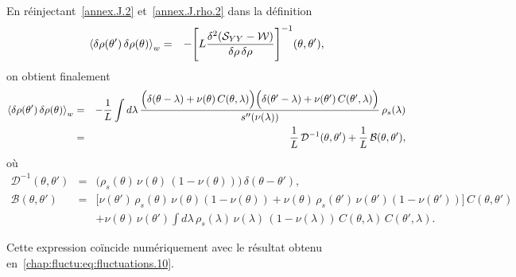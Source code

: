 En réinjectant~\eqref{annex.J.2} et~\eqref{annex.J.rho.2} dans la définition
\begin{eqnarray}
	\braket{\delta\rho(\theta')  \, \delta\rho(\theta)}_w	
	&=& -  \Bigg[ L \frac{ \delta^2 ( \mathcal{S}_{YY} -  \mathcal{W} )}{\delta \rho \, \delta \rho }\Bigg]^{-1} ( \theta , \theta'),		
\end{eqnarray}
on obtient finalement
\begin{eqnarray}\label{annex.J.3}
	\braket{\delta\rho(\theta')  \, \delta\rho(\theta)}_w  
	&=& -\frac{1}{L}  \int d \lambda \, \frac{ \Big( \delta ( \theta - \lambda ) + \nu (\theta)\, C(\theta,\lambda) \Big) \Big( \delta ( \theta' - \lambda ) + \nu (\theta')\, C(\theta',\lambda) \Big)}{s''(\nu(\lambda))} \, \rho_s (\lambda) \\
	&=& \frac{1}{L}\, \mathcal{D}^{-1}(\theta , \theta') + \frac{1}{L}\, \mathcal{B}(\theta , \theta'),		
\end{eqnarray}
où
\begin{eqnarray}
	\mathcal{D}^{-1}(\theta , \theta' ) &=& \big( \rho_s(\theta)\, \nu(\theta)\, (1 - \nu(\theta)) \big)\, \delta ( \theta - \theta' ), \\
	\mathcal{B}(\theta , \theta' ) 
	&=& \Big[ \nu (\theta')\, \rho_s(\theta)\, \nu(\theta)(1 - \nu(\theta)) 
	+ \nu (\theta)\, \rho_s(\theta')\, \nu(\theta')(1 - \nu(\theta')) \Big]\, C(\theta,\theta') \\
	&& + \nu (\theta)\, \nu (\theta') \int d \lambda \, \rho_s(\lambda)\, \nu(\lambda)\,(1 - \nu(\lambda))\, C(\theta,\lambda)\, C(\theta',\lambda).
\end{eqnarray}

Cette expression coïncide numériquement avec le résultat obtenu en~\eqref{chap:fluctu:eq:fluctuations.10}.



















